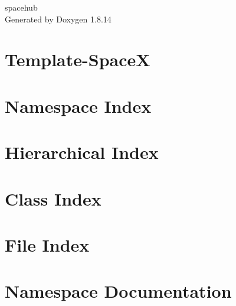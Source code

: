 \documentclass[twoside]{book}
\newcommand{\+}{\discretionary{\mbox{\scriptsize$\hookleftarrow$}}{}{}}
\newcommand{\clearemptydoublepage}{%
  \newpage{\pagestyle{empty}\cleardoublepage}%
}
\begin{document}
\hypersetup{pageanchor=false,
             bookmarksnumbered=true,
             pdfencoding=unicode
            }
\begin{titlepage}
\vspace*{7cm}
\begin{center}%
{\Large spacehub }\\
\vspace*{1cm}
{\large Generated by Doxygen 1.8.14}\\
\end{center}
\end{titlepage}
\clearemptydoublepage
{}
\tableofcontents
\clearemptydoublepage
{}
\hypersetup{pageanchor=true}

\chapter{Template-\/\+SpaceX}
\label{md__r_e_a_d_m_e}

\chapter{Namespace Index}

\chapter{Hierarchical Index}

\chapter{Class Index}

\chapter{File Index}

\chapter{Namespace Documentation}



\end{document}
